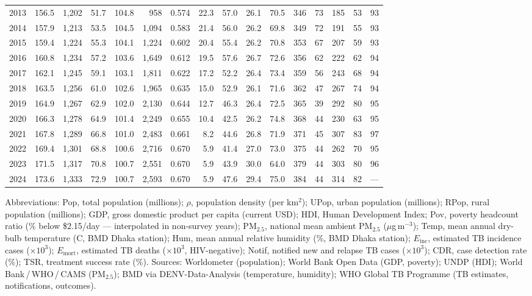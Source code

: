 \begin{table}
\begin{tabular}{lrrrrrrrrrrrrrrr}
2013 & 156.5 & 1,202 & 51.7 & 104.8 & 958 & 0.574 & 22.3 & 57.0 & 26.1 & 70.5 & 346 & 73 & 185 & 53 & 93 \\
2014 & 157.9 & 1,213 & 53.5 & 104.5 & 1,094 & 0.583 & 21.4 & 56.0 & 26.2 & 69.8 & 349 & 72 & 191 & 55 & 93 \\
2015 & 159.4 & 1,224 & 55.3 & 104.1 & 1,224 & 0.602 & 20.4 & 55.4 & 26.2 & 70.8 & 353 & 67 & 207 & 59 & 93 \\
2016 & 160.8 & 1,234 & 57.2 & 103.6 & 1,649 & 0.612 & 19.5 & 57.6 & 26.7 & 72.6 & 356 & 62 & 222 & 62 & 94 \\
2017 & 162.1 & 1,245 & 59.1 & 103.1 & 1,811 & 0.622 & 17.2 & 52.2 & 26.4 & 73.4 & 359 & 56 & 243 & 68 & 94 \\
2018 & 163.5 & 1,256 & 61.0 & 102.6 & 1,965 & 0.635 & 15.0 & 52.9 & 26.1 & 71.6 & 362 & 47 & 267 & 74 & 94 \\
2019 & 164.9 & 1,267 & 62.9 & 102.0 & 2,130 & 0.644 & 12.7 & 46.3 & 26.4 & 72.5 & 365 & 39 & 292 & 80 & 95 \\
2020 & 166.3 & 1,278 & 64.9 & 101.4 & 2,249 & 0.655 & 10.4 & 42.5 & 26.2 & 74.8 & 368 & 44 & 230 & 63 & 95 \\
2021 & 167.8 & 1,289 & 66.8 & 101.0 & 2,483 & 0.661 & 8.2 & 44.6 & 26.8 & 71.9 & 371 & 45 & 307 & 83 & 97 \\
2022 & 169.4 & 1,301 & 68.8 & 100.6 & 2,716 & 0.670 & 5.9 & 41.4 & 27.0 & 73.0 & 375 & 44 & 262 & 70 & 95 \\
2023 & 171.5 & 1,317 & 70.8 & 100.7 & 2,551 & 0.670 & 5.9 & 43.9 & 30.0 & 64.0 & 379 & 44 & 303 & 80 & 96 \\
2024 & 173.6 & 1,333 & 72.9 & 100.7 & 2,593 & 0.670 & 5.9 & 47.6 & 29.4 & 75.0 & 384 & 44 & 314 & 82 & --- \\
\bottomrule
\end{tabular}
\par\smallskip
\raggedright\footnotesize Abbreviations: Pop, total population (millions); $\rho$, population density (per km$^{2}$); UPop, urban population (millions); RPop, rural population (millions); GDP, gross domestic product per capita (current USD); HDI, Human Development Index; Pov, poverty headcount ratio (\% below \$2.15/day --- interpolated in non-survey years); PM$_{2.5}$, national mean ambient PM$_{2.5}$ ($\mu$g\,m$^{-3}$); Temp, mean annual dry-bulb temperature (\textdegree C, BMD Dhaka station); Hum, mean annual relative humidity (\%, BMD Dhaka station); $E_{\mathrm{inc}}$, estimated TB incidence cases ($\times 10^3$); $E_{\mathrm{mort}}$, estimated TB deaths ($\times 10^3$, HIV-negative); Notif, notified new and relapse TB cases ($\times 10^3$); CDR, case detection rate (\%); TSR, treatment success rate (\%). Sources: Worldometer (population); World Bank Open Data (GDP, poverty); UNDP (HDI); World Bank\,/\,WHO\,/\,CAMS (PM$_{2.5}$); BMD via DENV-Data-Analysis (temperature, humidity); WHO Global TB Programme (TB estimates, notifications, outcomes).
\end{table}
